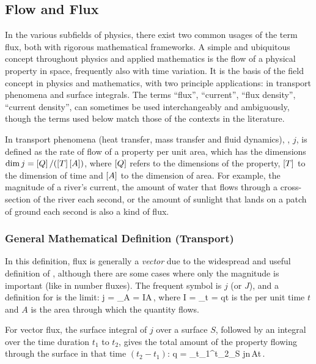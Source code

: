 \subsection{Flow and Flux}
In the various subfields of physics, there exist two common usages of the term flux, both with rigorous mathematical frameworks. A simple and ubiquitous concept throughout physics and applied mathematics is the flow of a physical property in space, frequently also with time variation. It is the basis of the field concept in physics and mathematics, with two principle applications: in transport phenomena and surface integrals. The terms ``flux'', ``current'', ``flux density'', ``current density'', can sometimes be used interchangeably and ambiguously, though the terms used below match those of the contexts in the literature.

In transport phenomena (heat transfer, mass transfer and fluid dynamics), , $j$, is defined as the rate of flow of a property per unit area, which has the dimensions $\dim j = \left[{Q}\right]/(\left[{T}\right]\left[{A}\right])$, where $\left[{Q}\right]$ refers to the dimensions of the property, $\left[{T}\right]$ to the dimension of time and $\left[{A}\right]$ to the dimension of area. For example, the magnitude of a river's current, \ie the amount of water that flows through a cross-section of the river each second, or the amount of sunlight that lands on a patch of ground each second is also a kind of flux.


\subsubsection{General Mathematical Definition (Transport)}
In this definition, flux is generally a \emph{vector} due to the widespread and useful definition of , although there are some cases where only the magnitude is important (like in number fluxes). The frequent symbol is $j$ (or $J$), and a definition for  is the limit:
\beq
j = \lim_{\diff A} = \xod IA\,,
\eeq
where
\beq
I = \lim_{\diff t} = \xod qt
\eeq
is the  per unit time $t$ and $A$ is the area through which the quantity flows.

For vector flux, the surface integral of $j$ over a surface $S$, followed by an integral over the time duration $t_1$ to $t_2$, gives the total amount of the property flowing through the surface in that time $(t_2 − t_1)$:
\beq
q = \int_{t_1}^{t_2}\iint_{S} j\iprod n\,\dx A\dx t\,.
\eeq

